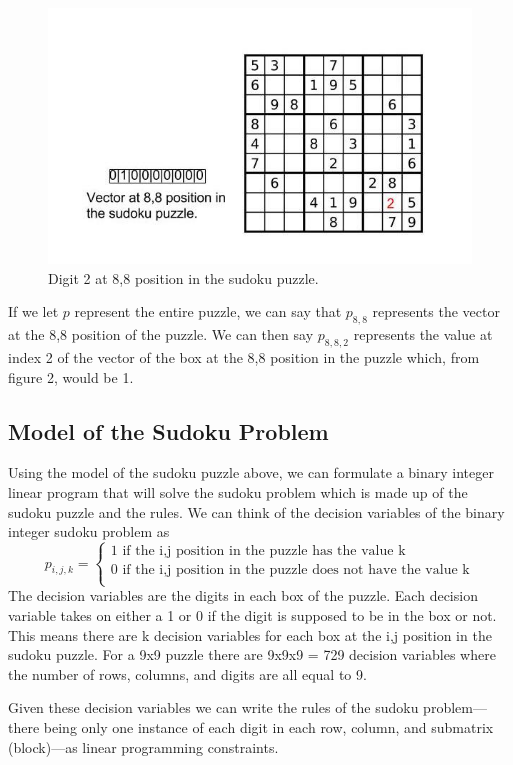 \documentclass[12pt]{article}
\begin{document}
\begin{figure}[H]
\centering
\includegraphics[scale=.4]{sudoku_puzzle_vector.jpg}
\caption{Digit 2 at 8,8 position in the sudoku puzzle.}
\end{figure}
If we let $p$ represent the entire puzzle, we can say that $p_{8,8}$ represents the vector at the 8,8 position of the puzzle.  We can then say $p_{8,8,2}$ represents the value at index 2 of the vector of the box at the 8,8 position in the puzzle which, from figure 2, would be 1.

\subsection{Model of the Sudoku Problem}
Using the model of the sudoku puzzle above, we can formulate a binary integer linear program that will solve the sudoku problem which is made up of the sudoku puzzle and the rules.  We can think of the decision variables of the binary integer sudoku problem as \cite{sudoku4}
\[p_{i,j,k} = 
\begin{cases}
1 \text{ if the i,j position in the puzzle has the value k} \\
0 \text{ if the i,j position in the puzzle does not have the value k} \\
\end{cases}
\]
The decision variables are the digits in each box of the puzzle.  Each decision variable takes on either a 1 or 0 if the digit is supposed to be in the box or not.  This means there are k decision variables for each box at the i,j position in the sudoku puzzle.  For a 9x9 puzzle there are 9x9x9 = 729 decision variables where the number of rows, columns, and digits are all equal to 9.

Given these decision variables we can write the rules of the sudoku problem---there being only one instance of each digit in each row, column, and submatrix (block)---as linear programming constraints.
\end{document}
